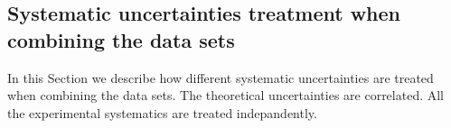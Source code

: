 %


\subsection{Systematic uncertainties treatment when combining the data sets}

In this Section we describe how different systematic uncertainties are treated when combining the data sets. The theoretical uncertainties are correlated. All the experimental systematics are treated indepandently.

